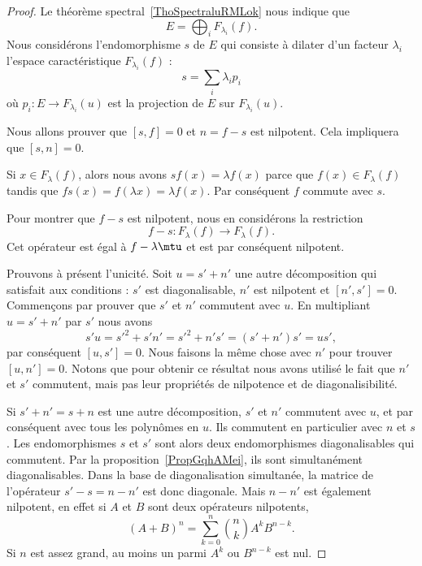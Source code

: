 \begin{proof}
	Le théorème spectral~\ref{ThoSpectraluRMLok} nous indique que
	\begin{equation}
		E=\bigoplus_iF_{\lambda_i}(f).
	\end{equation}
	Nous considérons l'endomorphisme \( s\) de \( E\) qui consiste à dilater d'un facteur \( \lambda_i\) l'espace caractéristique \( F_{\lambda_i}(f)\) :
	\begin{equation}
		s=\sum_i\lambda_ip_i
	\end{equation}
	où \( p_i\colon E\to F_{\lambda_i}(u)\) est la projection de \( E\) sur \( F_{\lambda_i}(u)\).

	Nous allons prouver que \( [s,f]=0\) et \( n=f-s\) est nilpotent. Cela impliquera que \( [s,n]=0\).

	Si \( x\in F_{\lambda}(f)\), alors nous avons \( sf(x)=\lambda f(x)\) parce que \( f(x)\in F_{\lambda}(f)\) tandis que \( fs(x)=f(\lambda x)=\lambda f(x)\). Par conséquent \( f\) commute avec \( s\).

	Pour montrer que \( f-s\) est nilpotent, nous en considérons la restriction
	\begin{equation}
		f-s\colon F_{\lambda}(f)\to F_{\lambda}(f).
	\end{equation}
	Cet opérateur est égal à \( f-\lambda\mtu\) et est par conséquent nilpotent.

	Prouvons à présent l'unicité. Soit \( u=s'+n'\) une autre décomposition qui satisfait aux conditions : \( s'\) est diagonalisable, \( n'\) est nilpotent et \( [n',s']=0\). Commençons par prouver que \( s'\) et \( n'\) commutent avec \( u\). En multipliant \( u=s'+n'\) par \( s'\) nous avons
	\begin{equation}
		s'u=s'^2+s'n'=s'^2+n's'=(s'+n')s'=us',
	\end{equation}
	par conséquent \( [u,s']=0\). Nous faisons la même chose avec \( n'\) pour trouver \( [u,n']=0\). Notons que pour obtenir ce résultat nous avons utilisé le fait que \( n'\) et \( s'\) commutent, mais pas leur propriétés de nilpotence et de diagonalisibilité.


	Si \( s'+n'=s+n\) est une autre décomposition, \( s'\) et \( n'\) commutent avec \( u\), et par conséquent avec tous les polynômes en \( u\). Ils commutent en particulier avec \( n\) et \( s\). Les endomorphismes \( s\) et \( s'\) sont alors deux endomorphismes diagonalisables qui commutent. Par la proposition~\ref{PropGqhAMei}, ils sont simultanément diagonalisables. Dans la base de diagonalisation simultanée, la matrice de l'opérateur \( s'-s=n-n'\) est donc diagonale. Mais \( n-n'\) est également nilpotent, en effet si \( A\) et \( B\) sont deux opérateurs nilpotents,
	\begin{equation}
		(A+B)^n=\sum_{k=0}^n\binom{n}{k}A^kB^{n-k}.
	\end{equation}
	Si \( n\) est assez grand, au moins un parmi \( A^k\) ou \( B^{n-k}\) est nul.


\end{proof}

